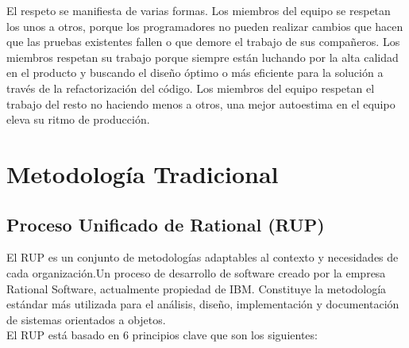 \documentclass[a4paper,11pt]{article}
\begin{document}
El respeto se manifiesta de varias formas. Los miembros del equipo se respetan los unos a otros, porque los programadores no pueden realizar cambios que hacen que las pruebas existentes fallen o que demore el trabajo de sus compañeros. Los miembros respetan su trabajo porque siempre están luchando por la alta calidad en el producto y buscando el diseño óptimo o más eficiente para la solución a través de la refactorización del código. Los miembros del equipo respetan el trabajo del resto no haciendo menos a otros, una mejor autoestima en el equipo eleva su ritmo de producción.

\newpage
\section{Metodología Tradicional}
\subsection{Proceso Unificado de Rational (RUP)}
El RUP es un conjunto de metodologías adaptables al contexto y necesidades de cada organización.Un proceso de desarrollo de software creado por la empresa Rational Software, actualmente propiedad de IBM. Constituye la metodología estándar más utilizada para el análisis, diseño, implementación y documentación de sistemas orientados a objetos.\\
El RUP está basado en 6 principios clave que son los siguientes:
\end{document}
